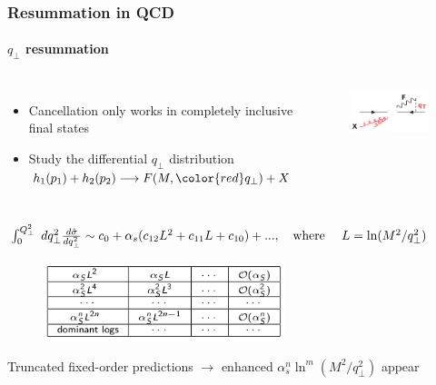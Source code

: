 \documentclass[aspectratio=43]{beamer}
\begin{document}
\begin{frame}

	\frametitle{Resummation in QCD}
	\framesubtitle{$q_{\perp}$ resummation}
	
	\begin{columns}
	
		
		\begin{itemize}
			\item \footnotesize Cancellation only works in completely inclusive final states \\
			\item \footnotesize Study the differential $q_{\perp}$ distribution \\
			$h_{1}(p_{1}) + h_{2}(p_{2}) \longrightarrow F(M, {\color{red}q_{\perp}}) + X$
		\end{itemize}
		
		
		\begin{figure}
			\includegraphics[width = 4cm]{plots/part2/qT_diagram.png}
		\end{figure}

	\end{columns}

	\footnotesize 
	$\int_{0}^{Q_{\perp}^{2}} \; dq_{\perp}^{2} \frac{d\hat{\sigma}}{dq_{\perp}^{2}} \sim c_{0} + \alpha_{s}(c_{12}L^{2} + c_{11}L + c_{10}) + ..., \textrm{\quad where \quad} L = \ln (M^{2} / q_{\perp}^{2})$

	\begin{figure}
		\includegraphics[width = 7cm]{plots/part2/qT_logs_table.png}
	\end{figure}

	\footnotesize Truncated fixed-order predictions $\rightarrow$ {\color{red}enhanced $\alpha_{s}^{n}\ln^{m}(M^{2}/q_{\perp}^{2})$ appear}

\end{frame}
\end{document}
